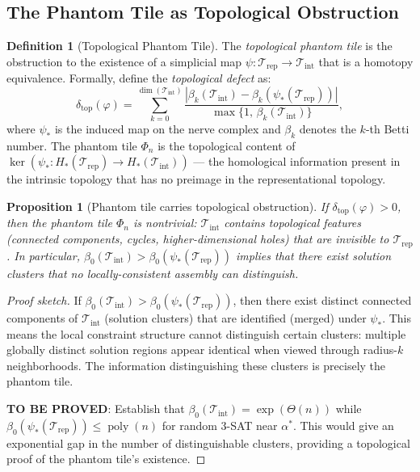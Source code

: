 \documentclass[11pt]{article}
\newtheorem{proposition}[theorem]{Proposition}
\theoremstyle{definition}
\newtheorem{definition}[theorem]{Definition}
\theoremstyle{remark}
\DeclareMathOperator{\poly}{poly}
\begin{document}
\subsection{The Phantom Tile as Topological Obstruction}

\begin{definition}[Topological Phantom Tile]
\label{def:topo-phantom}
The \emph{topological phantom tile} is the obstruction to the existence
of a simplicial map $\psi: \mathcal{T}_{\mathrm{rep}} \to
\mathcal{T}_{\mathrm{int}}$ that is a homotopy equivalence.  Formally,
define the \emph{topological defect} as:
\[
  \delta_{\mathrm{top}}(\varphi) =
  \sum_{k=0}^{\dim(\mathcal{T}_{\mathrm{int}})}
  \frac{|\beta_k(\mathcal{T}_{\mathrm{int}}) -
         \beta_k(\psi_*(\mathcal{T}_{\mathrm{rep}}))|}{
         \max\{1,\, \beta_k(\mathcal{T}_{\mathrm{int}})\}},
\]
where $\psi_*$ is the induced map on the nerve complex and
$\beta_k$ denotes the $k$-th Betti number.  The phantom tile
$\Phi_n$ is the topological content of
$\ker(\psi_*: H_*(\mathcal{T}_{\mathrm{rep}}) \to
H_*(\mathcal{T}_{\mathrm{int}}))$ --- the homological information
present in the intrinsic topology that has no preimage in the
representational topology.
\end{definition}

\begin{proposition}[Phantom tile carries topological obstruction]
\label{prop:phantom-topo}
If $\delta_{\mathrm{top}}(\varphi) > 0$, then the phantom tile
$\Phi_n$ is nontrivial: $\mathcal{T}_{\mathrm{int}}$ contains
topological features (connected components, cycles, higher-dimensional
holes) that are invisible to $\mathcal{T}_{\mathrm{rep}}$.  In
particular, $\beta_0(\mathcal{T}_{\mathrm{int}}) >
\beta_0(\psi_*(\mathcal{T}_{\mathrm{rep}}))$ implies that there
exist solution clusters that no locally-consistent assembly can
distinguish.
\end{proposition}

\begin{proof}[Proof sketch]
If $\beta_0(\mathcal{T}_{\mathrm{int}}) >
\beta_0(\psi_*(\mathcal{T}_{\mathrm{rep}}))$, then there exist
distinct connected components of $\mathcal{T}_{\mathrm{int}}$ (solution
clusters) that are identified (merged) under $\psi_*$.  This means
the local constraint structure cannot distinguish certain clusters:
multiple globally distinct solution regions appear identical when
viewed through radius-$k$ neighborhoods.  The information distinguishing
these clusters is precisely the phantom tile.

\textbf{TO BE PROVED}: Establish that $\beta_0(\mathcal{T}_{\mathrm{int}})
= \exp(\Theta(n))$ while $\beta_0(\psi_*(\mathcal{T}_{\mathrm{rep}}))
\leq \poly(n)$ for random 3-SAT near $\alpha^*$.  This would give
an exponential gap in the number of distinguishable clusters, providing
a topological proof of the phantom tile's existence.
\end{proof}
\end{document}
